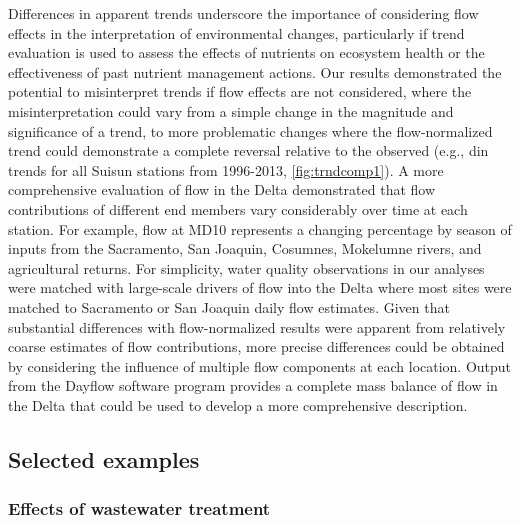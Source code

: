 \documentclass[letterpaper,12pt,oneside]{article}\usepackage[]{graphicx}\usepackage[]{color}
\begin{document}
Differences in apparent trends underscore the importance of considering flow effects in the interpretation of environmental changes, particularly if trend evaluation is used to assess the effects of nutrients on ecosystem health or the effectiveness of past nutrient management actions.  Our results demonstrated the potential to misinterpret trends if flow effects are not considered, where the misinterpretation could vary from a simple change in the magnitude and significance of a trend, to more problematic changes where the flow-normalized trend could demonstrate a complete reversal relative to the observed (e.g., \ac{din} trends for all Suisun stations from 1996-2013, \cref{fig:trndcomp1}). A more comprehensive evaluation of flow in the Delta demonstrated that flow contributions of different end members vary considerably over time at each station\cite{Novick15}.  For example, flow at MD10 represents a changing percentage by season of inputs from the Sacramento, San Joaquin, Cosumnes, Mokelumne rivers, and agricultural returns.   For simplicity, water quality observations in our analyses were matched with large-scale drivers of flow into the Delta where most sites were matched to Sacramento or San Joaquin daily flow estimates.  Given that substantial differences with flow-normalized results were apparent from relatively coarse estimates of flow contributions, more precise differences could be obtained by considering the influence of multiple flow components at each location. Output from the Dayflow software program\cite{IEP16} provides a complete mass balance of flow in the Delta that could be used to develop a more comprehensive description.

\subsection{Selected examples}

\subsubsection{Effects of wastewater treatment}
\end{document}
